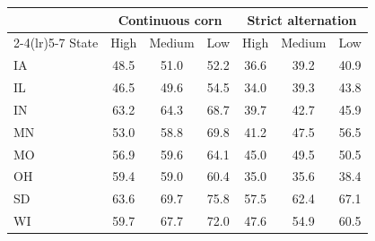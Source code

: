 \begin{tabular}{lcccccc}
\toprule
& \multicolumn{3}{c}{Continuous corn} & \multicolumn{3}{c}{Strict alternation}\\
\cmidrule(lr){2-4}\cmidrule(lr){5-7}
State & High & Medium & Low & High & Medium & Low\\
\midrule
IA & 48.5 & 51.0 & 52.2 & 36.6 & 39.2 & 40.9 \\
IL & 46.5 & 49.6 & 54.5 & 34.0 & 39.3 & 43.8 \\
IN & 63.2 & 64.3 & 68.7 & 39.7 & 42.7 & 45.9 \\
MN & 53.0 & 58.8 & 69.8 & 41.2 & 47.5 & 56.5 \\
MO & 56.9 & 59.6 & 64.1 & 45.0 & 49.5 & 50.5 \\
OH & 59.4 & 59.0 & 60.4 & 35.0 & 35.6 & 38.4 \\
SD & 63.6 & 69.7 & 75.8 & 57.5 & 62.4 & 67.1 \\
WI & 59.7 & 67.7 & 72.0 & 47.6 & 54.9 & 60.5 \\
\bottomrule
\end{tabular}
